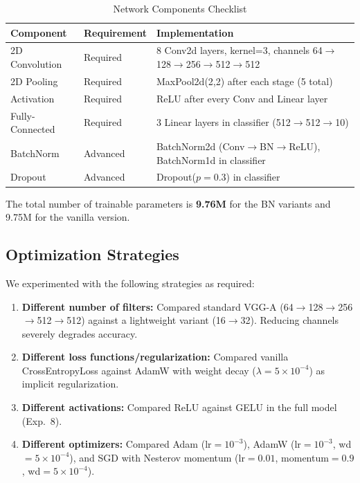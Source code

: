 \documentclass[11pt,a4paper]{article}
\begin{document}
\begin{table}[H]
\centering
\caption{Network Components Checklist}
\label{tab:components}
\begin{tabular}{@{}lll@{}}
\toprule
\textbf{Component} & \textbf{Requirement} & \textbf{Implementation} \\
\midrule
2D Convolution    & Required & 8 Conv2d layers, kernel=3, channels 64$\to$128$\to$256$\to$512$\to$512 \\
2D Pooling        & Required & MaxPool2d(2,2) after each stage (5 total) \\
Activation        & Required & ReLU after every Conv and Linear layer \\
Fully-Connected   & Required & 3 Linear layers in classifier (512$\to$512$\to$10) \\
\midrule
BatchNorm         & Advanced & BatchNorm2d (Conv$\to$BN$\to$ReLU), BatchNorm1d in classifier \\
Dropout           & Advanced & Dropout($p{=}0.3$) in classifier \\
\bottomrule
\end{tabular}
\end{table}

The total number of trainable parameters is \textbf{9.76M} for the BN variants and 9.75M for the
vanilla version.

\subsection{Optimization Strategies}

We experimented with the following strategies as required:

\begin{enumerate}[label=\textbf{\arabic*.}, leftmargin=*]
    \item \textbf{Different number of filters:} Compared standard VGG-A (64$\to$128$\to$256$\to$512$\to$512)
          against a lightweight variant (16$\to$32). Reducing channels severely degrades accuracy.
    \item \textbf{Different loss functions/regularization:} Compared vanilla CrossEntropyLoss
          against AdamW with weight decay ($\lambda{=}5{\times}10^{-4}$) as implicit regularization.
    \item \textbf{Different activations:} Compared ReLU against GELU in the full model (Exp.~8).
    \item \textbf{Different optimizers:} Compared Adam (lr${=}10^{-3}$), AdamW (lr${=}10^{-3}$, wd${=}5{\times}10^{-4}$),
          and SGD with Nesterov momentum (lr${=}0.01$, momentum${=}0.9$, wd${=}5{\times}10^{-4}$).
\end{enumerate}
\end{document}
